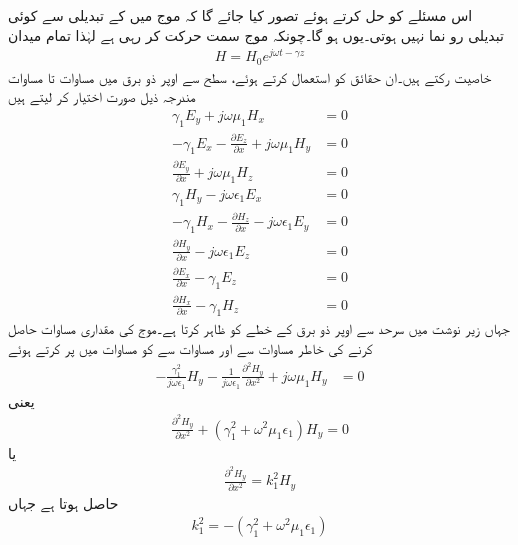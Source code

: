 اس مسئلے کو حل کرتے ہوئے تصور کیا جائے گا کہ موج میں   کے تبدیلی سے کوئی تبدیلی رو نما نہیں ہوتی۔یوں  ہو گا۔چونکہ موج  سمت حرکت کر رہی ہے لہٰذا تمام میدان
\begin{align}\label{مساوات_مویج_حرکت_کرتی_موج_عمومی}
H=H_0 e^{j\omega t -\gamma z}
\end{align}
خاصیت رکتے ہیں۔ان حقائق کو استعمال کرتے ہوئے، سطح سے اوپر ذو برق میں مساوات  تا مساوات  مندرجہ ذیل صورت اختیار کر لیتے ہیں
\begin{align}
\gamma_1  E_y+j\omega \mu_1 H_x&=0 \label{مساوات_مویج_سطح_الف}\\
-\gamma_1  E_x-\frac{\partial E_z}{\partial x}+j\omega\mu_1  H_y&=0 \label{مساوات_مویج_سطح_ب}\\
\frac{\partial E_y}{\partial x}+j\omega\mu_1  H_z&=0 \label{مساوات_مویج_سطح_پ}\\
\gamma_1 H_y-j\omega\epsilon_1  E_x&=0 \label{مساوات_مویج_سطح_ت}\\
-\gamma_1 H_x-\frac{\partial H_z}{\partial x}-j\omega\epsilon_1  E_y&=0 \label{مساوات_مویج_سطح_ٹ}\\
\frac{\partial H_y}{\partial x}-j\omega\epsilon_1 E_z&=0 \label{مساوات_مویج_سطح_ث}\\
\frac{\partial E_x}{\partial x}-\gamma_1  E_z&=0\label{مساوات_مویج_سطح_ج}\\
\frac{\partial H_x}{\partial x}-\gamma_1  H_z&=0 \label{مساوات_مویج_سطح_چ}
\end{align}
جہاں زیر نوشت میں  سرحد سے اوپر ذو برق کے خطے کو ظاہر کرتا ہے۔موج کی مقداری مساوات  حاصل کرنے کی خاطر مساوات  سے  اور مساوات  سے  کو مساوات  میں پر کرتے ہوئے
\begin{align*}
-\frac{\gamma_1^2}{j\omega \epsilon_1}  H_y-\frac{1}{j\omega \epsilon_1}\frac{\partial^2 H_y}{\partial x^2}+j\omega\mu_1  H_y&=0
\end{align*}
یعنی
\begin{align*}
\frac{\partial^2 H_y}{\partial x^2}+\left(\gamma_1^2+\omega^2 \mu_1 \epsilon_1 \right) H_y=0
\end{align*}
یا
\begin{align}\label{مساوات_مویج_سطح_ذو_برق_موج}
\frac{\partial^2 H_y}{\partial x^2}= k_1^2H_y
\end{align}
حاصل ہوتا ہے جہاں
\begin{align}\label{مساوات_مویج_سطحی_موج_مستقل_الف}
k_1^2=-\left(\gamma_1^2+\omega^2 \mu_1 \epsilon_1 \right)
\end{align}
